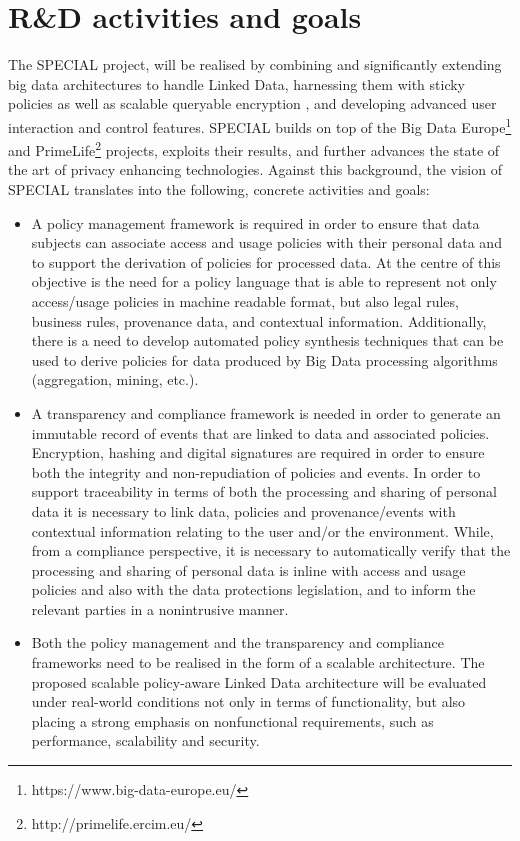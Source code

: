 \documentclass[runningheads,a4paper]{llncs}
\begin{document}
\section{R\&D activities and goals}

The SPECIAL project, will be realised by combining and significantly extending big data architectures to handle Linked Data, harnessing them with sticky
 policies  \cite{__RefHeading__352_1658379157} as well as scalable queryable encryption  \cite{__RefHeading__356_1658379157} \cite{__RefHeading__350_1658379157}, and developing advanced user
 interaction and control features. SPECIAL builds on top of the Big Data Europe\footnote{https://www.big-data-europe.eu/} and PrimeLife\footnote{http://primelife.ercim.eu/} projects, exploits their results, and further advances the state of the art of privacy enhancing technologies. Against this background, the
 vision of SPECIAL translates into the following, concrete activities and goals:
\begin{itemize}
\item A policy management framework is required in order to ensure that data
 subjects can associate access and usage policies with their personal data and
 to support the derivation of policies for processed data. At the centre of
 this objective is the need for a policy language that is able to represent not
 only access/usage policies in machine readable format, but also legal rules,
 business rules, provenance data, and contextual information. Additionally,
 there is a need to develop automated policy synthesis techniques that can be
 used to derive policies for data produced by Big Data processing algorithms
 (aggregation, mining, etc.).
\item A transparency and compliance framework is needed in order to generate an
 immutable record of events that are linked to data and associated policies.
 Encryption, hashing and digital signatures are required in order to ensure
 both the integrity and non-repudiation of policies and events. In order to
 support traceability in terms of both the processing and sharing of personal
 data it is necessary to link data, policies and provenance/events with contextual information relating to the user and/or the environment. While, from a
 compliance perspective, it is necessary to automatically verify that the processing and sharing of personal data is inline with access and usage policies
 and also with the data protections legislation, and to inform the relevant
 parties in a nonintrusive manner.
\item Both the policy management and the transparency and compliance frameworks need to be realised in the form of a scalable architecture. The proposed
 scalable policy-aware Linked Data architecture will be evaluated under real-world conditions not only in terms of functionality, but also placing a strong
 emphasis on nonfunctional requirements, such as performance, scalability
 and security.
\end{itemize}
\end{document}
